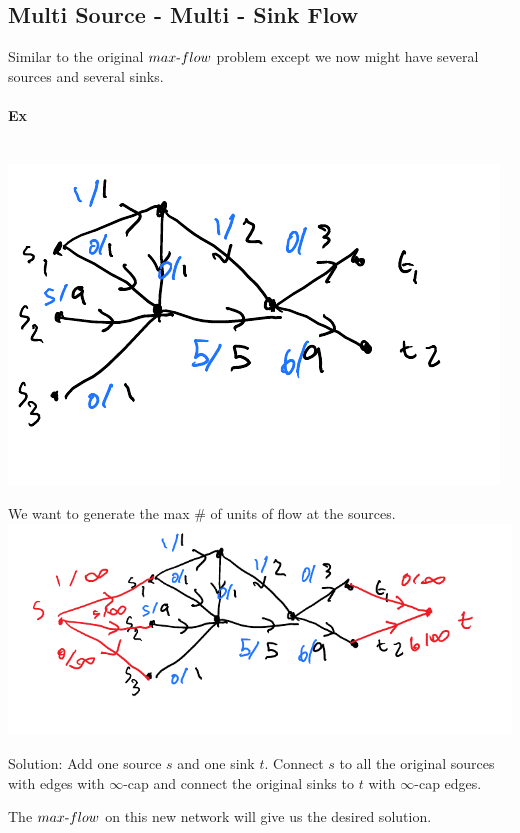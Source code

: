 \documentclass[12 pt]{article}
\begin{document}
        \subsection{Multi Source - Multi - Sink Flow}
        Similar to the original $max\hbox{-}flow$ problem except we
        now might have several sources and several sinks.
        \paragraph{Ex} ~
        \\ \includegraphics[width=.9\textwidth]{i81.pdf}

        We want to generate the max \# of units of flow at the sources.
        \\ \includegraphics[width=.9\textwidth]{i82.pdf}

        Solution: Add one source $s$ and one sink $t$. Connect $s$ to
        all the original sources with edges with $\infty$-cap and
        connect the original sinks to $t$ with $\infty$-cap edges.

        The $max\hbox{-}flow$ on this new network will give us the
        desired solution.
\end{document}
